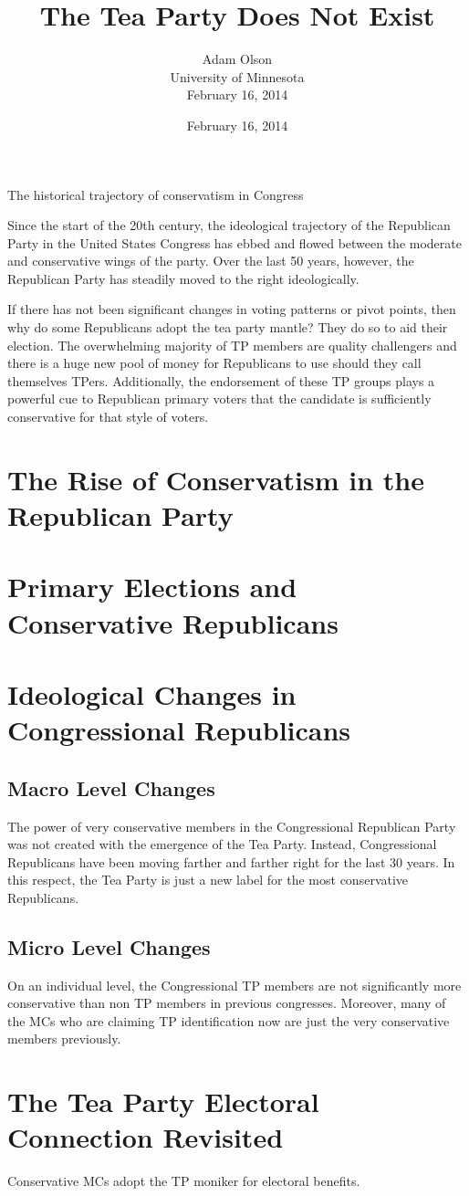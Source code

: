 \documentclass[12pt]{article}
\author{Adam Olson\\University of Minnesota\\February 16, 2014}
\title{The Tea Party Does Not Exist}
\date{February 16, 2014}
\makeatletter
\renewcommand{\maketitle}{\bgroup\setlength{\parindent}{0pt}
\begin{flushleft}
  \textbf{\@title}

  \@author
\end{flushleft}\egroup
}
\makeatother
\begin{document}
\maketitle

The historical trajectory of conservatism in Congress 

Since the start of the 20th century, the ideological trajectory of the Republican Party in the United States Congress has ebbed and flowed between the moderate and conservative wings of the party. Over the last 50 years, however, the Republican Party has steadily moved to the right ideologically.


If there has not been significant changes in voting patterns or pivot points, then why do some Republicans adopt the tea party mantle? They do so to aid their election. The overwhelming majority of TP members are quality challengers and there is a huge new pool of money for Republicans to use should they
call themselves TPers. Additionally, the endorsement of these TP groups plays a powerful cue to Republican primary voters that the candidate is sufficiently conservative for that style of voters.

\section{The Rise of Conservatism in the Republican Party}

\section{Primary Elections and Conservative Republicans}

\section{Ideological Changes in Congressional Republicans}
\subsection{Macro Level Changes}
The power of very conservative members in the Congressional Republican Party was not created with the emergence of the Tea Party. Instead, Congressional Republicans have been moving farther and farther right for the last 30 years. In this respect, the Tea Party is just a new label for the most conservative Republicans.

\subsection{Micro Level Changes}
On an individual level, the Congressional TP members are not significantly more conservative than non TP members in previous congresses. Moreover, many of the MCs who are claiming TP identification now are just the very conservative members previously.

\section{The Tea Party Electoral Connection Revisited}
Conservative MCs adopt the TP moniker for electoral benefits.

\newpage
    {}


\end{document}
